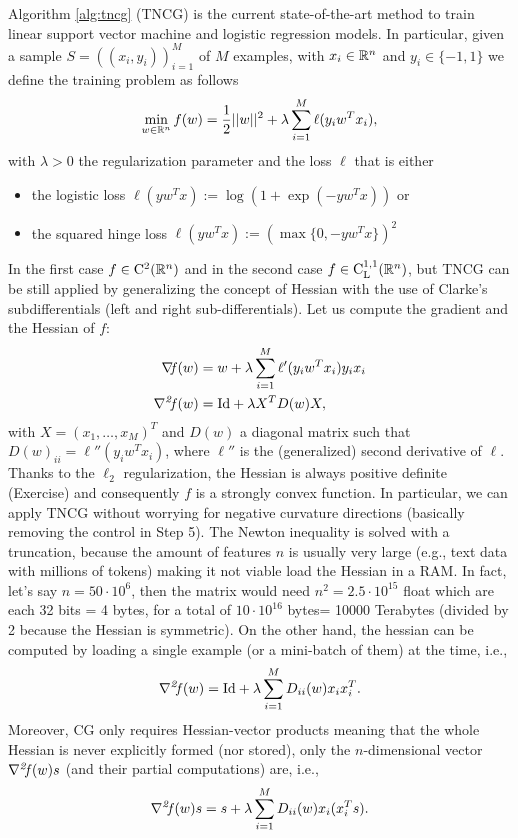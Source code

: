 \documentclass[10pt,a4paper]{article}
\begin{document}
\begin{example}
	Algorithm \ref{alg:tncg} (TNCG) is the current state-of-the-art method to train linear support vector machine and logistic regression models. In particular, given a sample $S=((x_i, y_i))_{i=1}^M$ of $M$ examples, with $x_i\in \mathbb{R}^n$ and $y_i\in\{-1,1\}$ we define the training problem as follows
	$$ \min_{w\in\mathbb{R}^n} f(w) = \frac{1}{2}||w||^2 + \lambda \sum_{i=1}^{M} \ell(y_i w^Tx_i),$$
	with  $\lambda>0$ the regularization parameter and the loss $\ell$ that is either
	\begin{itemize}
		\item the logistic loss $\ell(y w^Tx):= \log(1+\exp(-yw^Tx))$ or
		\item the squared hinge loss $\ell(y w^Tx):= (\max\{0, -yw^Tx\})^2$
	\end{itemize}
In the first case $f\in \mathord{\mathrm{C^2}}(\mathbb{R}^n)$ and in the second case $f\in \mathord{\mathrm{C^{1,1}_{L}}}(\mathbb{R}^n)$, but TNCG can be still applied by generalizing the concept of Hessian with the use of Clarke's subdifferentials (left and right sub-differentials). 
Let us compute the gradient and the Hessian of $f$:
\begin{equation*}
	\begin{split}
		\operatorname*{\mathit{\nabla \!f}} (w) &= w+ \lambda\sum_{i=1}^{M} \ell'(y_i w^Tx_i)y_ix_i\\
		\operatorname*{\mathit{\nabla^2 \!f}}(w) &= \mathord{\mathrm{Id}} + \lambda X^T D(w) X ,
	\end{split}
\end{equation*}
with $X= (x_1, \dots, x_M)^T$ and $D(w)$ a diagonal matrix such that $D(w)_{ii}= \ell''(y_iw^Tx_i)$, where $\ell''$ is the (generalized) second derivative of $\ell$. 
Thanks to the $\ell_2$ regularization, the Hessian is always positive definite (Exercise) and consequently $f$ is a strongly convex function. In particular, we can apply TNCG without worrying for negative curvature directions (basically removing the control in Step 5).
The Newton inequality is solved with a truncation, because the amount of features $n$ is usually very large (e.g., text data with millions of tokens) making it not viable load the Hessian in a RAM. In fact, let's say $n=50 \cdot 10^6$, then the matrix would need $n^2=2.5\cdot 10^{15}$ float which are each 32 bits = 4 bytes, for a total of $10 \cdot 10^{16}$ bytes= 10000 Terabytes (divided by 2 because the Hessian is symmetric).
On the other hand, the hessian can be computed by loading a single example (or a mini-batch of them) at the time, i.e., 
$$ \operatorname*{\mathit{\nabla^2 \!f}}(w) = \mathord{\mathrm{Id}} + \lambda\sum_{i=1}^{M} D_{ii}(w) x_ix_i^T.$$
Moreover, CG only requires Hessian-vector products meaning that the whole Hessian is never explicitly formed (nor stored), only the $n$-dimensional vector $\operatorname*{\mathit{\nabla^2 \!f}}(w)s$ (and their partial computations) are, i.e., 
$$ \operatorname*{\mathit{\nabla^2 \!f}}(w)s = s + \lambda\sum_{i=1}^{M} D_{ii}(w) x_i(x_i^Ts).$$
\end{example}
\end{document}
